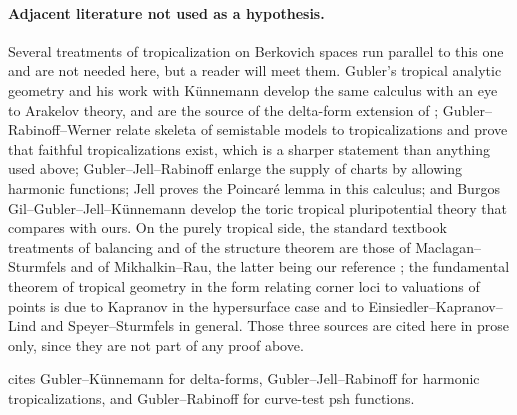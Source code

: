 \paragraph{Adjacent literature not used as a hypothesis.}
Several treatments of tropicalization on Berkovich spaces run parallel to
this one and are not needed here, but a reader will meet them. Gubler's
tropical analytic geometry and his work with K\"unnemann
\cite{GK17,GK19} develop the same calculus with an eye to Arakelov theory,
and are the source of the delta-form extension of ;
Gubler--Rabinoff--Werner relate skeleta of semistable models to
tropicalizations and prove that faithful tropicalizations exist, which is a
sharper statement than anything used above; Gubler--Jell--Rabinoff
\cite{GJR26} enlarge the supply of charts by allowing harmonic functions;
Jell \cite{Jell16} proves the Poincar\'e lemma in this calculus;
and Burgos Gil--Gubler--Jell--K\"unnemann \cite{BGJKK25} develop the toric
tropical pluripotential theory that  compares with
ours. On the purely tropical side, the standard textbook treatments of
balancing and of the structure theorem are those of Maclagan--Sturmfels and
of Mikhalkin--Rau, the latter being our reference \cite{MR18Tropical}; the
fundamental theorem of tropical geometry in the form relating corner loci to
valuations of points is due to Kapranov in the hypersurface case and to
Einsiedler--Kapranov--Lind and Speyer--Sturmfels in general. Those three
sources are cited here in prose only, since they are not part of any proof
above.

 cites Gubler--K\"unnemann for delta-forms,
Gubler--Jell--Rabinoff for harmonic tropicalizations, and
Gubler--Rabinoff for curve-test psh functions.
